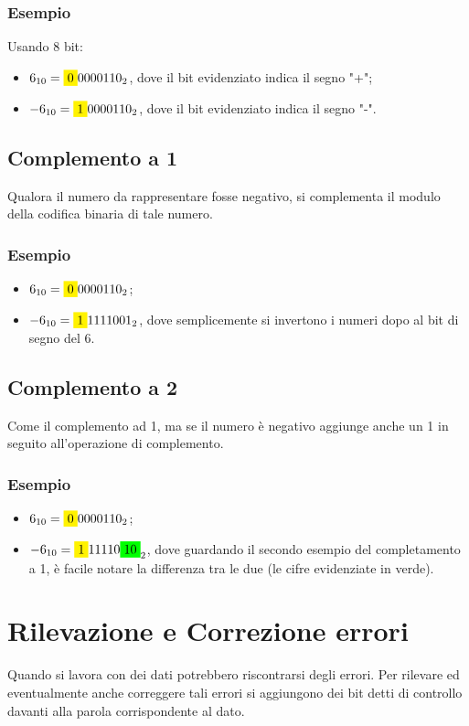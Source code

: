 \documentclass[12pt]{article}
\begin{document}
\subsubsection{Esempio}
Usando 8 bit:
\begin{itemize}
    \item $6_{10} = \colorbox{yellow}{0}0000110_2$, dove il bit evidenziato indica il segno "+";
    \item $-6_{10} = \colorbox{yellow}{1}0000110_2$, dove il bit evidenziato indica il segno "-".
\end{itemize}
\subsection{Complemento a 1}
Qualora il numero da rappresentare fosse negativo, si complementa il modulo della codifica binaria di tale numero.
\subsubsection{Esempio}
\begin{itemize}
    \item $6_{10} = \colorbox{yellow}{0}0000110_2$;
    \item $-6_{10} = \colorbox{yellow}{1}1111001_2$, dove semplicemente si invertono i numeri dopo al bit di segno del 6.
\end{itemize}
\subsection{Complemento a 2}
Come il complemento ad 1, ma se il numero è negativo aggiunge anche un 1 in seguito all'operazione di complemento.
\subsubsection{Esempio}
\begin{itemize}
    \item $6_{10} = \colorbox{yellow}{0}0000110_2$;
    \item $-6_{10} = \colorbox{yellow}{1}11110\colorbox{green}{10}_2$, dove guardando il secondo esempio del completamento a 1, è facile notare la differenza tra le due (le cifre evidenziate in verde).
\end{itemize}
\section{Rilevazione e Correzione errori}
Quando si lavora con dei dati potrebbero riscontrarsi degli errori. Per rilevare ed eventualmente anche correggere tali errori si aggiungono dei bit detti di controllo davanti alla parola corrispondente al dato.
\end{document}
